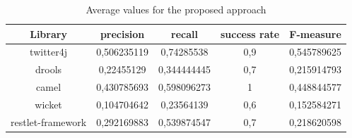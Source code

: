 \begin{table}[H]
  \caption{ Average values for the proposed approach }
  \label{Table:8}
 \begin{center}
\begin{tabular}{|c|c|c|c|c|}

\hline
 \textbf{Library} & \textbf{precision}  & \textbf{recall} & \textbf{success rate} & \textbf{F-measure} \\ 
\hline
 twitter4j &  0,506235119 & 0,74285538 &  0,9 & 0,545789625 \\
\hline
drools & 0,22455129 &   0,344444445 & 0,7 & 0,215914793\\
\hline
camel & 0,430785693  & 0,598096273 & 1 & 0,448844577 \\
\hline 
wicket & 0,104704642 & 0,23564139 & 0,6 & 0,152584271 \\
\hline
restlet-framework &  0,292169883 &  0,539874547 & 0,7 & 0,218620598  \\
\hline
\end{tabular}
\end{center}
\end{table} 


